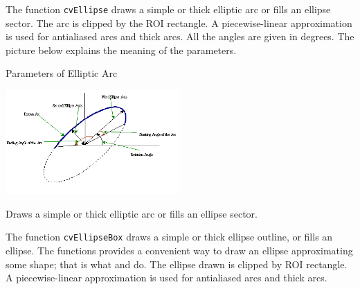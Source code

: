The function \texttt{cvEllipse} draws a simple or thick elliptic
arc or fills an ellipse sector. The arc is clipped by the ROI rectangle.
A piecewise-linear approximation is used for antialiased arcs and
thick arcs. All the angles are given in degrees. The picture below
explains the meaning of the parameters.

Parameters of Elliptic Arc

\includegraphics[width=0.5\textwidth]{pics/ellipse.png}


Draws a simple or thick elliptic arc or fills an ellipse sector.


\begin{description}
\end{description}

The function \texttt{cvEllipseBox} draws a simple or thick ellipse outline, or fills an ellipse. The functions provides a convenient way to draw an ellipse approximating some shape; that is what  and  do. The ellipse drawn is clipped by ROI rectangle. A piecewise-linear approximation is used for antialiased arcs and thick arcs.

\label{FillPoly}


